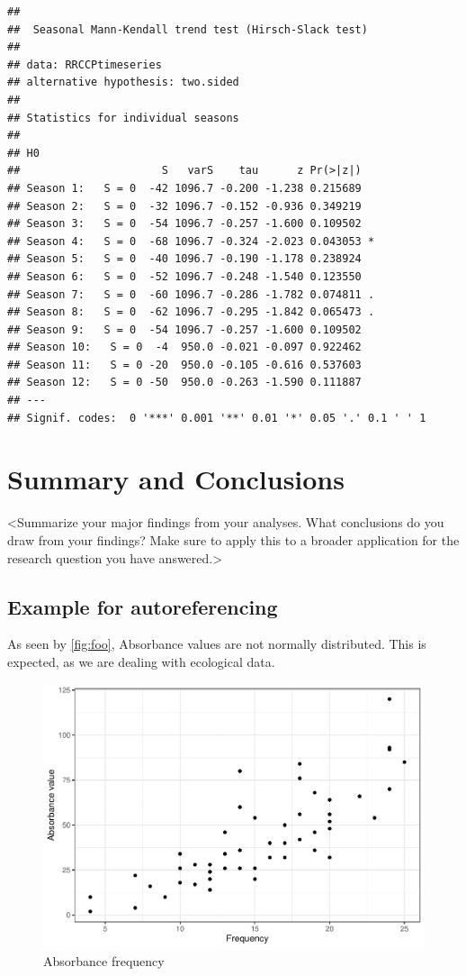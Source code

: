 \documentclass[12pt,]{article}
\begin{document}
\begin{verbatim}
## 
##  Seasonal Mann-Kendall trend test (Hirsch-Slack test)
## 
## data: RRCCPtimeseries
## alternative hypothesis: two.sided
## 
## Statistics for individual seasons
## 
## H0
##                      S   varS    tau      z Pr(>|z|)  
## Season 1:   S = 0  -42 1096.7 -0.200 -1.238 0.215689  
## Season 2:   S = 0  -32 1096.7 -0.152 -0.936 0.349219  
## Season 3:   S = 0  -54 1096.7 -0.257 -1.600 0.109502  
## Season 4:   S = 0  -68 1096.7 -0.324 -2.023 0.043053 *
## Season 5:   S = 0  -40 1096.7 -0.190 -1.178 0.238924  
## Season 6:   S = 0  -52 1096.7 -0.248 -1.540 0.123550  
## Season 7:   S = 0  -60 1096.7 -0.286 -1.782 0.074811 .
## Season 8:   S = 0  -62 1096.7 -0.295 -1.842 0.065473 .
## Season 9:   S = 0  -54 1096.7 -0.257 -1.600 0.109502  
## Season 10:   S = 0  -4  950.0 -0.021 -0.097 0.922462  
## Season 11:   S = 0 -20  950.0 -0.105 -0.616 0.537603  
## Season 12:   S = 0 -50  950.0 -0.263 -1.590 0.111887  
## ---
## Signif. codes:  0 '***' 0.001 '**' 0.01 '*' 0.05 '.' 0.1 ' ' 1
\end{verbatim}

\newpage

\hypertarget{summary-and-conclusions}{%
\section{Summary and Conclusions}\label{summary-and-conclusions}}

\textless Summarize your major findings from your analyses. What
conclusions do you draw from your findings? Make sure to apply this to a
broader application for the research question you have
answered.\textgreater{}

\hypertarget{example-for-autoreferencing}{%
\subsection{Example for
autoreferencing}\label{example-for-autoreferencing}}

As seen by \autoref{fig:foo}, Absorbance values are not normally
distributed. This is expected, as we are dealing with ecological data.

\begin{figure}
\centering
\includegraphics{Project_Template_files/figure-latex/foo-1.pdf}
\caption{\label{fig:foo}Absorbance frequency}
\end{figure}
\end{document}
